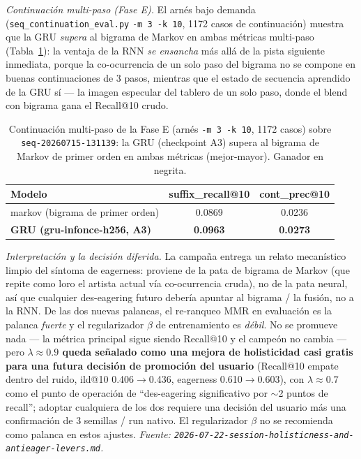 \documentclass[11pt]{article}
\newcommand{\dsid}[1]{\texttt{\small #1}}
\newcommand{\best}[1]{\textbf{#1}}
\begin{document}
\emph{Continuación multi-paso (Fase E).} El arnés bajo demanda
(\texttt{seq\_continuation\_eval.py} \texttt{-m 3 -k 10}, \num{1172} casos de
continuación) muestra que la GRU \emph{supera} al bigrama de Markov en ambas métricas
multi-paso (Tabla~\ref{tab:nexttrack-continuation}): la ventaja de la RNN \emph{se ensancha} más
allá de la pista siguiente inmediata, porque la co-ocurrencia de un solo paso del
bigrama no se compone en buenas continuaciones de 3 pasos, mientras que el estado de
secuencia aprendido de la GRU sí --- la imagen especular del tablero de un solo paso,
donde el blend con bigrama gana el Recall@10 crudo.

\begin{table}[ht]
  \centering
  \caption{Continuación multi-paso de la Fase E (arnés \texttt{-m 3 -k 10},
  \num{1172} casos) sobre \dsid{seq-20260715-131139}: la GRU (checkpoint A3) supera al
  bigrama de Markov de primer orden en ambas métricas (mejor-mayor). Ganador en negrita.}
  \label{tab:nexttrack-continuation}
  {\footnotesize\setlength{\tabcolsep}{6pt}\begin{tabular}{lcc}
    \toprule
    Modelo & suffix\_recall@10 & cont\_prec@10 \\
    \midrule
    markov (bigrama de primer orden) & 0.0869 & 0.0236 \\
    \best{GRU (gru-infonce-h256, A3)} & \best{0.0963} & \best{0.0273} \\
    \bottomrule
  \end{tabular}}
\end{table}

\emph{Interpretación y la decisión diferida.} La campaña entrega un relato mecanístico
limpio del síntoma de eagerness: proviene de la pata de bigrama de Markov (que repite
como loro el artista actual vía co-ocurrencia cruda), no de la pata neural, así que
cualquier des-eagering futuro debería apuntar al bigrama / la fusión, no a la RNN. De
las dos nuevas palancas, el re-ranqueo MMR en evaluación es la palanca \emph{fuerte} y
el regularizador $\beta$ de entrenamiento es \emph{débil}. No se promueve nada --- la
métrica principal sigue siendo Recall@10 y el campeón no cambia --- pero
\textbf{$\lambda\approx\num{0.9}$ queda señalado como una mejora de holisticidad casi
gratis para una futura decisión de promoción del usuario} (Recall@10 empate dentro del
ruido, ild@10 \num{0.406}$\to$\num{0.436}, eagerness \num{0.610}$\to$\num{0.603}), con
$\lambda\approx\num{0.7}$ como el punto de operación de ``des-eagering significativo por
$\sim$2 puntos de recall''; adoptar cualquiera de los dos requiere una decisión del
usuario más una confirmación de 3 semillas / run nativo. El regularizador $\beta$ no se
recomienda como palanca en estos ajustes.
\emph{Fuente: \texttt{2026-07-22-session-holisticness-and-antieager-levers.md}.}
\end{document}
